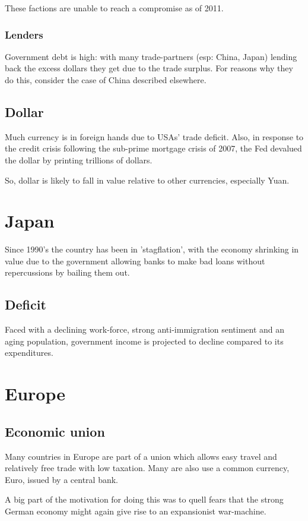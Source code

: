 \documentclass[oneside, article]{memoir}
\begin{document}
These factions are unable to reach a compromise as of 2011.

\subsection{Lenders}
Government debt is high: with many trade-partners (esp: China, Japan) lending back the excess dollars they get due to the trade surplus. For reasons why they do this, consider the case of China described elsewhere.

\section{Dollar}
Much currency is in foreign hands due to USAs' trade deficit. Also, in response to the credit crisis following the sub-prime mortgage crisis of 2007, the Fed devalued the dollar by printing trillions of dollars.

So, dollar is likely to fall in value relative to other currencies, especially Yuan.

\chapter{Japan}
Since 1990's the country has been in 'stagflation', with the economy shrinking in value due to the government allowing banks to make bad loans without repercussions by bailing them out.

\section{Deficit}
Faced with a declining work-force, strong anti-immigration sentiment and an aging population, government income is projected to decline compared to its expenditures.

\chapter{Europe}
\section{Economic union}
Many countries in Europe are part of a union which allows easy travel and relatively free trade with low taxation. Many are also use a common currency, Euro, issued by a central bank.

A big part of the motivation for doing this was to quell fears that the strong German economy might again give rise to an expansionist war-machine.
\end{document}
